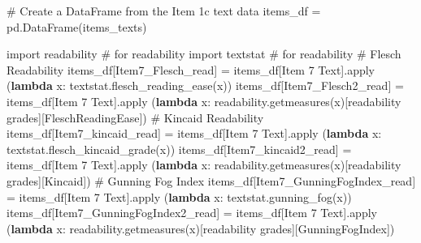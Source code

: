\documentclass[
  letterpaper,
  DIV=11,
  numbers=noendperiod]{scrreprt}
\newenvironment{Shaded}{\begin{snugshade}}{\end{snugshade}}
\newcommand{\BuiltInTok}[1]{\textcolor[rgb]{0.00,0.23,0.31}{#1}}
\newcommand{\CommentTok}[1]{\textcolor[rgb]{0.37,0.37,0.37}{#1}}
\newcommand{\ImportTok}[1]{\textcolor[rgb]{0.00,0.46,0.62}{#1}}
\newcommand{\KeywordTok}[1]{\textcolor[rgb]{0.00,0.23,0.31}{\textbf{#1}}}
\newcommand{\NormalTok}[1]{\textcolor[rgb]{0.00,0.23,0.31}{#1}}
\newcommand{\OperatorTok}[1]{\textcolor[rgb]{0.37,0.37,0.37}{#1}}
\newcommand{\StringTok}[1]{\textcolor[rgb]{0.13,0.47,0.30}{#1}}
\begin{document}
\begin{Shaded}
\begin{Highlighting}[]
\CommentTok{\# Create a DataFrame from the Item 1c text data}
\NormalTok{items\_df }\OperatorTok{=}\NormalTok{ pd.DataFrame(items\_texts)}
\end{Highlighting}
\end{Shaded}

\begin{Shaded}
\begin{Highlighting}[]
\ImportTok{import}\NormalTok{ readability }\CommentTok{\# for readability }
\ImportTok{import}\NormalTok{ textstat }\CommentTok{\# for readability }
\CommentTok{\# Flesch Readability }
\NormalTok{items\_df[}\StringTok{\textquotesingle{}Item7\_Flesch\_read\textquotesingle{}}\NormalTok{] }\OperatorTok{=}\NormalTok{ items\_df[}\StringTok{\textquotesingle{}Item 7 Text\textquotesingle{}}\NormalTok{].}\BuiltInTok{apply}\NormalTok{ (}\KeywordTok{lambda}\NormalTok{ x: textstat.flesch\_reading\_ease(x))}
\NormalTok{items\_df[}\StringTok{\textquotesingle{}Item7\_Flesch2\_read\textquotesingle{}}\NormalTok{] }\OperatorTok{=}\NormalTok{ items\_df[}\StringTok{\textquotesingle{}Item 7 Text\textquotesingle{}}\NormalTok{].}\BuiltInTok{apply}\NormalTok{ (}\KeywordTok{lambda}\NormalTok{ x: readability.getmeasures(x)[}\StringTok{\textquotesingle{}readability grades\textquotesingle{}}\NormalTok{][}\StringTok{\textquotesingle{}FleschReadingEase\textquotesingle{}}\NormalTok{])}
\CommentTok{\# Kincaid Readability }
\NormalTok{items\_df[}\StringTok{\textquotesingle{}Item7\_kincaid\_read\textquotesingle{}}\NormalTok{] }\OperatorTok{=}\NormalTok{ items\_df[}\StringTok{\textquotesingle{}Item 7 Text\textquotesingle{}}\NormalTok{].}\BuiltInTok{apply}\NormalTok{ (}\KeywordTok{lambda}\NormalTok{ x: textstat.flesch\_kincaid\_grade(x))}
\NormalTok{items\_df[}\StringTok{\textquotesingle{}Item7\_kincaid2\_read\textquotesingle{}}\NormalTok{] }\OperatorTok{=}\NormalTok{ items\_df[}\StringTok{\textquotesingle{}Item 7 Text\textquotesingle{}}\NormalTok{].}\BuiltInTok{apply}\NormalTok{ (}\KeywordTok{lambda}\NormalTok{ x: readability.getmeasures(x)[}\StringTok{\textquotesingle{}readability grades\textquotesingle{}}\NormalTok{][}\StringTok{\textquotesingle{}Kincaid\textquotesingle{}}\NormalTok{])}
\CommentTok{\# Gunning Fog Index}
\NormalTok{items\_df[}\StringTok{\textquotesingle{}Item7\_GunningFogIndex\_read\textquotesingle{}}\NormalTok{] }\OperatorTok{=}\NormalTok{ items\_df[}\StringTok{\textquotesingle{}Item 7 Text\textquotesingle{}}\NormalTok{].}\BuiltInTok{apply}\NormalTok{ (}\KeywordTok{lambda}\NormalTok{ x: textstat.gunning\_fog(x))}
\NormalTok{items\_df[}\StringTok{\textquotesingle{}Item7\_GunningFogIndex2\_read\textquotesingle{}}\NormalTok{] }\OperatorTok{=}\NormalTok{ items\_df[}\StringTok{\textquotesingle{}Item 7 Text\textquotesingle{}}\NormalTok{].}\BuiltInTok{apply}\NormalTok{ (}\KeywordTok{lambda}\NormalTok{ x: readability.getmeasures(x)[}\StringTok{\textquotesingle{}readability grades\textquotesingle{}}\NormalTok{][}\StringTok{\textquotesingle{}GunningFogIndex\textquotesingle{}}\NormalTok{])}

\end{Highlighting}
\end{Shaded}
\end{document}
